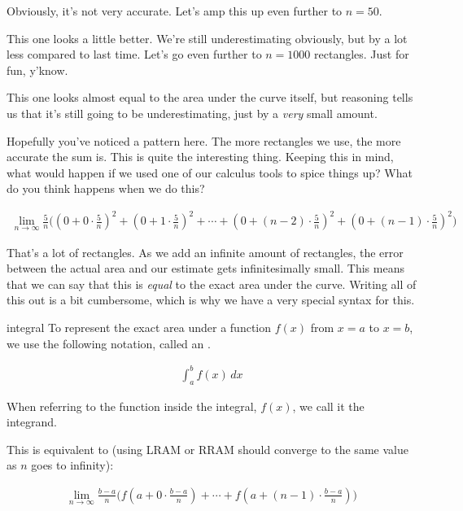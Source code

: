 Obviously, it's not very accurate. Let's amp this up even further to \( n = 50 \).

\begin{figure}[H]
    \centering
    
\end{figure}

This one looks a little better. We're still underestimating obviously, but by a lot less compared to last time. Let's go even further to \( n = 1000 \) rectangles. Just for fun, y'know.

\begin{figure}[H]
    \centering
    
\end{figure}

This one looks almost equal to the area under the curve itself, but reasoning tells us that it's still going to be underestimating, just by a \textit{very} small amount.

Hopefully you've noticed a pattern here. The more rectangles we use, the more accurate the sum is. This is quite the interesting thing. Keeping this in mind, what would happen if we used one of our calculus tools to spice things up? What do you think happens when we do this?

\begin{align*}
    \lim_{n \to \infty} \frac{5}{n} \Biggl( \left( 0 + 0 \cdot \frac{5}{n} \right)^2 + \left( 0 + 1 \cdot \frac{5}{n} \right)^2 + \cdots + \left( 0 + \left( n - 2 \right) \cdot \frac{5}{n} \right)^2 + \left( 0 + \left( n - 1 \right) \cdot \frac{5}{n} \right)^2 \Biggr)
\end{align*}

That's a lot of rectangles. As we add an infinite amount of rectangles, the error between the actual area and our estimate gets infinitesimally small. This means that we can say that this is \textit{equal} to the exact area under the curve. Writing all of this out is a bit cumbersome, which is why we have a very special syntax for this.

\begin{notation}{integral}
    To represent the exact area under a function \( f \left( x \right) \) from \( x = a \) to \( x = b \), we use the following notation, called an .

    \begin{align*}
        \int_{ a }^{ b } f \left( x \right) \, dx
    \end{align*}

    When referring to the function inside the integral, \( f \left( x \right) \), we call it the integrand.

    This is equivalent to (using LRAM or RRAM should converge to the same value as \( n \) goes to infinity):

    \begin{align*}
        \lim_{n \to \infty} \frac{b - a}{n} \Biggl( f \left( a + 0 \cdot \frac{b - a}{n} \right) + \cdots +  f \left( a + \left( n - 1 \right) \cdot \frac{b - a}{n} \right) \Biggr)
    \end{align*}
\end{notation}

